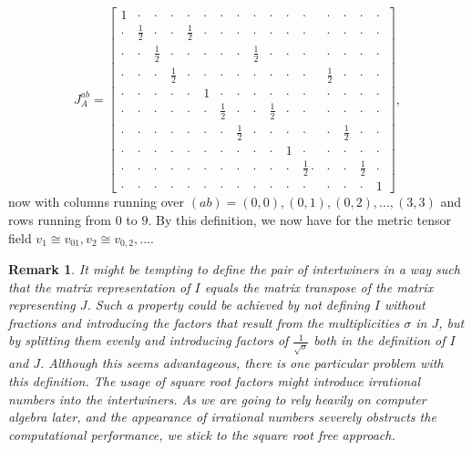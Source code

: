 \documentclass[a4paper,12pt, DIV=14, BCOR=5mm, twoside, headsepline, numbers=noenddot]{scrbook}
\newtheorem*{remark}{Remark}
\begin{document}
\begin{equation}\label{interJMet}
J^{ab}_{A} = \begin{bmatrix} 
                1 & \cdot & \cdot & \cdot & \cdot & \cdot & \cdot & \cdot & \cdot & \cdot & \cdot & \cdot & \cdot & \cdot & \cdot & \cdot \\
                \cdot & \frac{1}{2} & \cdot & \cdot & \frac{1}{2} & \cdot & \cdot & \cdot & \cdot & \cdot & \cdot & \cdot & \cdot & \cdot & \cdot & \cdot  \\
                \cdot & \cdot & \frac{1}{2} & \cdot & \cdot & \cdot & \cdot & \cdot & \frac{1}{2} & \cdot & \cdot & \cdot & \cdot & \cdot & \cdot & \cdot  \\
                \cdot & \cdot & \cdot & \frac{1}{2} & \cdot & \cdot & \cdot & \cdot & \cdot & \cdot & \cdot & \cdot & \frac{1}{2} & \cdot & \cdot & \cdot  \\
                \cdot & \cdot & \cdot & \cdot & \cdot & 1 & \cdot & \cdot & \cdot & \cdot & \cdot & \cdot & \cdot & \cdot & \cdot & \cdot  \\
                \cdot & \cdot & \cdot & \cdot & \cdot & \cdot & \frac{1}{2} & \cdot & \cdot & \frac{1}{2} & \cdot & \cdot & \cdot & \cdot & \cdot & \cdot  \\
                \cdot & \cdot & \cdot & \cdot & \cdot & \cdot & \cdot & \frac{1}{2} & \cdot & \cdot & \cdot & \cdot & \cdot & \frac{1}{2} & \cdot & \cdot  \\
                \cdot & \cdot & \cdot & \cdot & \cdot & \cdot & \cdot & \cdot & \cdot & \cdot & 1 & \cdot & \cdot & \cdot & \cdot & \cdot  \\
                \cdot & \cdot & \cdot & \cdot & \cdot & \cdot & \cdot & \cdot & \cdot & \cdot & \cdot & \frac{1}{2} \cdot & \cdot & \cdot & \frac{1}{2} & \cdot  \\
                \cdot & \cdot & \cdot & \cdot & \cdot & \cdot & \cdot & \cdot & \cdot & \cdot & \cdot & \cdot & \cdot & \cdot & \cdot & 1  
            \end{bmatrix},
\end{equation}
now with columns running over $(ab)={(0,0),(0,1),(0,2),...,(3,3)}$ and rows running from $0$ to $9$. By this definition, we now have for the metric tensor field $v_1 \cong v_{01}, v_2 \cong v_{0,2},...$.
\begin{remark}
It might be tempting to define the pair of intertwiners in a way such that the matrix representation of $I$ equals the matrix transpose of the matrix representing $J$. Such a property could be achieved by not defining $I$ without fractions and introducing the factors that result from the multiplicities $\sigma$ in $J$, but by splitting them evenly and introducing factors of $\frac{1}{\sqrt{\sigma}}$ both in the definition of $I$ and $J$. Although this seems advantageous, there is one particular problem with this definition. The usage of square root factors might introduce irrational numbers into the intertwiners. As we are going to rely heavily on computer algebra later, and the appearance of irrational numbers severely obstructs the computational performance, we stick to the square root free approach.  
\end{remark}
\end{document}
